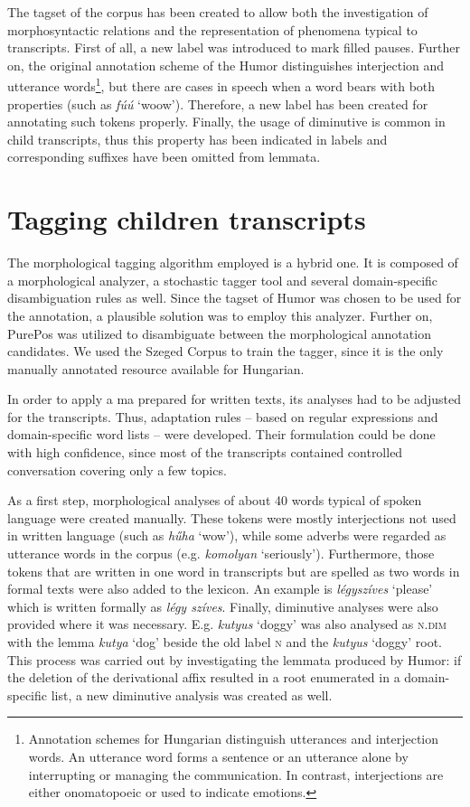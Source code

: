 
The tagset of the corpus has been created to allow both the investigation of morphosyntactic relations and the representation of phenomena typical to transcripts. 
First of all, a new label was introduced to mark filled pauses. 
Further on, the original annotation scheme of the Humor distinguishes interjection and utterance words\footnote{Annotation schemes for Hungarian distinguish utterances and interjection words. An utterance word forms a sentence or an utterance alone by interrupting or managing the communication. In contrast, interjections are either onomatopoeic or used to indicate emotions.},
but there are cases in speech when a word bears with both properties (such as \textit{fúú} `woow’). 
Therefore, a new label has been created for annotating such tokens properly. 
Finally, the usage of diminutive is common in child transcripts, thus this property has been indicated in labels and corresponding suffixes have been omitted from lemmata.

\section{Tagging children transcripts}
\label{sec:tagging}
The morphological tagging algorithm employed is a hybrid one. 
It is composed of a morphological analyzer, a stochastic tagger tool and several domain-specific disambiguation rules as well. 
Since the tagset of Humor was chosen to be used for the annotation, a plausible solution was to employ this analyzer. 
Further on, PurePos was utilized to disambiguate between the morphological annotation candidates. 
We used the Szeged Corpus \cite{Csendes2004} to train the tagger, since it is the only manually annotated resource available for Hungarian. 

In order to apply a \acrlong{ma} prepared for written texts, its analyses had to be adjusted for the transcripts. 
Thus, adaptation rules -- based on regular expressions and domain-specific word lists -- were developed.
Their formulation could be done with high confidence, since most of the transcripts contained controlled conversation covering only a few topics. 

As a first step, morphological analyses of about 40 words typical of spoken language were created manually. 
These tokens were mostly interjections not used in written language (such as \textit{hűha} `wow’), while some adverbs were regarded as utterance words in the corpus (e.g. \textit{komolyan} `seriously’). 
Furthermore, those tokens that are written in one word in transcripts but are spelled as two words in formal texts were also added to the lexicon. 
An example is \textit{légyszíves} `please’ which is written formally as \textit{légy szíves}. Finally, diminutive analyses were also provided where it was necessary. 
E.g. \textit{kutyus} `doggy’ was also analysed as \textsc{n.dim} with the lemma \textit{kutya} `dog’ beside the old label \textsc{n} and the \textit{kutyus} `doggy’ root. This process was carried out by investigating the lemmata produced by Humor: if the deletion of the derivational affix resulted in a root enumerated in a domain-specific list, a new diminutive analysis was created as well. 

